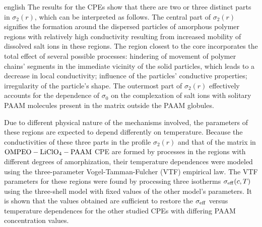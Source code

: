 \begin{otherlanguage*}{english}
The results for the CPEs show that there are two or three distinct parts in $ \sigma_2 (r) $, which can be interpreted as follows. The central part of $ \sigma_2 (r) $ signifies the formation around the dispersed particles of amorphous polymer regions with relatively high conductivity resulting from increased mobility of dissolved salt ions in these regions. The region closest to the core incorporates the total effect of several possible processes: hindering of movement of polymer chains' segments in the immediate vicinity of the solid particles, which leads to a decrease in local conductivity; influence of the particles' conductive properties; irregularity of the particle's shape. The outermost part of $ \sigma_2 (r) $ effectively accounts for the dependence of $ \sigma_0 $ on the complexation of salt ions with  solitary PAAM molecules present in the matrix outside the PAAM globules.

Due to different physical nature of the mechanisms involved, the parameters of these regions are expected to depend differently on temperature. Because the conductivities of these three parts in the profile $ \sigma_2 (r) $ and that of the matrix in $ \rm OMPEO-LiClO_4-PAAM $  CPE are formed by processes in the regions with different degrees of amorphization, their temperature dependences were modeled using the three-parameter Vogel-Tamman-Fulcher  (VTF) empirical law. The VTF parameters for these regions were found by processing three  isotherms $ \sigma_ {\rm eff} (c, T) $ using the three-shell model with fixed values  of the other model's parameters. It is shown that the  values obtained are sufficient to restore the $ \sigma_ {\rm eff} $ versus temperature dependences for the other studied CPEs with differing  PAAM concentration values.


\end{otherlanguage*}
